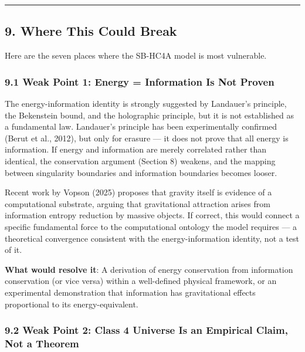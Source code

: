 \documentclass[
]{article}
\begin{document}
\begin{center}\rule{0.5\linewidth}{0.5pt}\end{center}

\hypertarget{where-this-could-break}{%
\subsection{9. Where This Could Break}\label{where-this-could-break}}

Here are the seven places where the SB-HC4A model is most vulnerable.

\hypertarget{weak-point-1-energy-information-is-not-proven}{%
\subsubsection{9.1 Weak Point 1: Energy = Information Is Not
Proven}\label{weak-point-1-energy-information-is-not-proven}}

The energy-information identity is strongly suggested by Landauer's
principle, the Bekenstein bound, and the holographic principle, but it
is not established as a fundamental law. Landauer's principle has been
experimentally confirmed (Berut et al., 2012), but only for erasure ---
it does not prove that all energy is information. If energy and
information are merely correlated rather than identical, the
conservation argument (Section 8) weakens, and the mapping between
singularity boundaries and information boundaries becomes looser.

Recent work by Vopson (2025) proposes that gravity itself is evidence of
a computational substrate, arguing that gravitational attraction arises
from information entropy reduction by massive objects. If correct, this
would connect a specific fundamental force to the computational ontology
the model requires --- a theoretical convergence consistent with the
energy-information identity, not a test of it.

\textbf{What would resolve it}: A derivation of energy conservation from
information conservation (or vice versa) within a well-defined physical
framework, or an experimental demonstration that information has
gravitational effects proportional to its energy-equivalent.

\hypertarget{weak-point-2-class-4-universe-is-an-empirical-claim-not-a-theorem}{%
\subsubsection{9.2 Weak Point 2: Class 4 Universe Is an Empirical Claim,
Not a
Theorem}\label{weak-point-2-class-4-universe-is-an-empirical-claim-not-a-theorem}}
\end{document}
